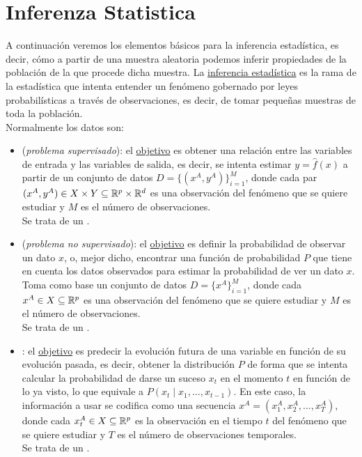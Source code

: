 \chapter{Inferenza Statistica}
A continuación veremos los elementos básicos para la inferencia estadística, es decir, cómo a partir de una muestra aleatoria podemos inferir propiedades de la población de la que procede dicha muestra. La \underline{inferencia estadística} es la rama de la estadística que intenta entender un fenómeno gobernado por leyes probabilísticas a través de observaciones, es decir, de tomar pequeñas muestras de toda la población. \\

\noindent
Normalmente los datos son:
\begin{itemize}
    \item {} (\textit{problema supervisado}): el \underline{objetivo} es obtener una relación entre las variables de entrada y las variables de salida, es decir, se intenta estimar $y=\hat{f}(x)$ a partir de un conjunto de datos $D=\{(x^A,y^A)\}_{i=1}^M$, donde cada par $(x^A,y^A)\in X\times Y\subseteq \mathbb{R}^p\times \mathbb{R}^d$ es una observación del fenómeno que se quiere estudiar y $M$ es el número de observaciones. \\
    \noindent
    Se trata de un .
    \item {} (\textit{problema no supervisado}): el \underline{objetivo} es definir la probabilidad de observar un dato $x$, o, mejor dicho, encontrar una función de probabilidad $P$ que tiene en cuenta los datos observados para estimar la probabilidad de ver un dato $x$. Toma como base un conjunto de datos $D=\{x^A\}_{i=1}^M$, donde cada $x^A\in X\subseteq \mathbb{R}^p$ es una observación del fenómeno que se quiere estudiar y $M$ es el número de observaciones. \\
    \noindent
    Se trata de un .
    \item {}: el \underline{objetivo} es predecir la evolución futura de una variable en función de su evolución pasada, es decir, obtener la distribución $P$ de forma que se intenta calcular la probabilidad de darse un suceso $x_t$ en el momento $t$ en función de lo ya visto, lo que equivale a $P(x_t\mid x_1, \ldots, x_{t-1})$. En este caso, la información a usar se codifica como una secuencia $x^A=(x_1^A,x_2^A,\ldots,x_T^A)$, donde cada $x_t^A\in X\subseteq \mathbb{R}^p$ es la observación en el tiempo $t$ del fenómeno que se quiere estudiar y $T$ es el número de observaciones temporales. \\
    \noindent
    Se trata de un .
\end{itemize}

